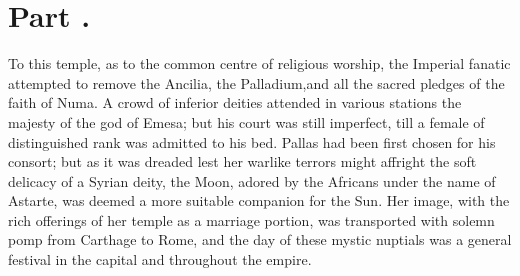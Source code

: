 \section{Part \thesection.}
\thispagestyle{simple}

To this temple, as to the common centre of religious worship, the
Imperial fanatic attempted to remove the Ancilia, the Palladium,\footnotemark[54]
and all the sacred pledges of the faith of Numa. A crowd of
inferior deities attended in various stations the majesty of the
god of Emesa; but his court was still imperfect, till a female of
distinguished rank was admitted to his bed. Pallas had been first
chosen for his consort; but as it was dreaded lest her warlike
terrors might affright the soft delicacy of a Syrian deity, the
Moon, adored by the Africans under the name of Astarte, was
deemed a more suitable companion for the Sun. Her image, with the
rich offerings of her temple as a marriage portion, was
transported with solemn pomp from Carthage to Rome, and the day
of these mystic nuptials was a general festival in the capital
and throughout the empire.\footnotemark[55]



